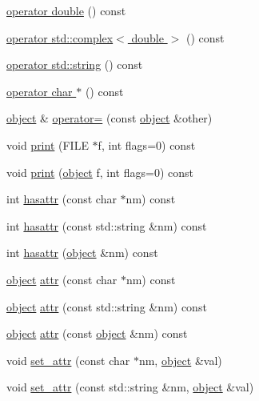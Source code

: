 \begin{DoxyCompactItemize}
\hyperlink{classpy_1_1object_abc8188f143e76ea85848915e4c821aa5}{operator double} () const 
\item 
\hyperlink{classpy_1_1object_ae66e6bc40ddafc73160e5cd9e62b4814}{operator std\+::complex$<$ double $>$} () const 
\item 
\hyperlink{classpy_1_1object_abfc8f06d77306ae9cdec437f7ff7ea6c}{operator std\+::string} () const 
\item 
\hyperlink{classpy_1_1object_a8948c7784cf1ad121c76ef5f952fb99e}{operator char $\ast$} () const 
\item 
\hyperlink{classpy_1_1object}{object} \& \hyperlink{classpy_1_1object_a84b1dddfada0fbeb12fe3d4699c5ec48}{operator=} (const \hyperlink{classpy_1_1object}{object} \&other)
\item 
void \hyperlink{classpy_1_1object_afd124da4bc59548e940de255fbaeea5f}{print} (F\+I\+L\+E $\ast$f, int flags=0) const 
\item 
void \hyperlink{classpy_1_1object_a171f48be076593fcf876a0cdcc0f7559}{print} (\hyperlink{classpy_1_1object}{object} f, int flags=0) const 
\item 
int \hyperlink{classpy_1_1object_a0bff232a230c2a92265ce47ad4f18bf3}{hasattr} (const char $\ast$nm) const 
\item 
int \hyperlink{classpy_1_1object_a2ccc3654259d03f22549eb41bed61fc8}{hasattr} (const std\+::string \&nm) const 
\item 
int \hyperlink{classpy_1_1object_a865db7b1b555f3a8d4ba5b0b5a696f5c}{hasattr} (\hyperlink{classpy_1_1object}{object} \&nm) const 
\item 
\hyperlink{classpy_1_1object}{object} \hyperlink{classpy_1_1object_af27843d8c770f1df3ffd3e5b110e2c15}{attr} (const char $\ast$nm) const 
\item 
\hyperlink{classpy_1_1object}{object} \hyperlink{classpy_1_1object_a55563dcde37cb975d17ce89be3144142}{attr} (const std\+::string \&nm) const 
\item 
\hyperlink{classpy_1_1object}{object} \hyperlink{classpy_1_1object_a440e202f12f536635b47f8eae07f512c}{attr} (const \hyperlink{classpy_1_1object}{object} \&nm) const 
\item 
void \hyperlink{classpy_1_1object_a42b0eecb2c5c804cfebf36f775dcb5a9}{set\+\_\+attr} (const char $\ast$nm, \hyperlink{classpy_1_1object}{object} \&val)
\item 
void \hyperlink{classpy_1_1object_aef6be7904a14444f799c1998a4d52208}{set\+\_\+attr} (const std\+::string \&nm, \hyperlink{classpy_1_1object}{object} \&val)
\item 

\end{DoxyCompactItemize}
